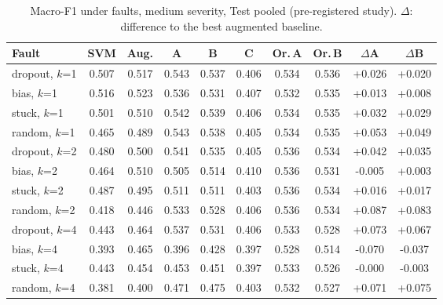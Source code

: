 \begin{table}[t]
\centering
\footnotesize
\caption{Macro-F1 under faults, medium severity, Test pooled (pre-registered study). $\Delta$: difference to the best augmented baseline.}
\label{tab:v1main}
\setlength{\tabcolsep}{3pt}
\begin{tabular}{lccccccccc}
\toprule
Fault & SVM & Aug. & A & B & C & Or.\,A & Or.\,B & $\Delta$A & $\Delta$B \\
\midrule
dropout, $k$=1 & 0.507 & 0.517 & 0.543 & 0.537 & 0.406 & 0.534 & 0.536 & +0.026 & +0.020 \\
bias, $k$=1 & 0.516 & 0.523 & 0.536 & 0.531 & 0.407 & 0.532 & 0.535 & +0.013 & +0.008 \\
stuck, $k$=1 & 0.501 & 0.510 & 0.542 & 0.539 & 0.406 & 0.534 & 0.535 & +0.032 & +0.029 \\
random, $k$=1 & 0.465 & 0.489 & 0.543 & 0.538 & 0.405 & 0.534 & 0.535 & +0.053 & +0.049 \\
dropout, $k$=2 & 0.480 & 0.500 & 0.541 & 0.535 & 0.405 & 0.536 & 0.534 & +0.042 & +0.035 \\
bias, $k$=2 & 0.464 & 0.510 & 0.505 & 0.514 & 0.410 & 0.536 & 0.531 & -0.005 & +0.003 \\
stuck, $k$=2 & 0.487 & 0.495 & 0.511 & 0.511 & 0.403 & 0.536 & 0.534 & +0.016 & +0.017 \\
random, $k$=2 & 0.418 & 0.446 & 0.533 & 0.528 & 0.406 & 0.536 & 0.534 & +0.087 & +0.083 \\
dropout, $k$=4 & 0.443 & 0.464 & 0.537 & 0.531 & 0.406 & 0.533 & 0.528 & +0.073 & +0.067 \\
bias, $k$=4 & 0.393 & 0.465 & 0.396 & 0.428 & 0.397 & 0.528 & 0.514 & -0.070 & -0.037 \\
stuck, $k$=4 & 0.443 & 0.454 & 0.453 & 0.451 & 0.397 & 0.533 & 0.526 & -0.000 & -0.003 \\
random, $k$=4 & 0.381 & 0.400 & 0.471 & 0.475 & 0.403 & 0.532 & 0.527 & +0.071 & +0.075 \\
\bottomrule
\end{tabular}
\end{table}
